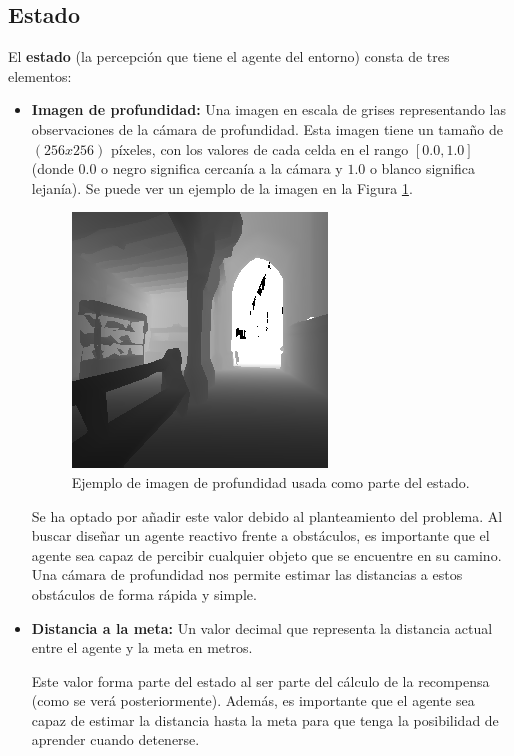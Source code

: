 \subsection{Estado}

El \textbf{estado} (la percepción que tiene el agente del entorno) consta de tres elementos:

\begin{itemize}
	\item \textbf{Imagen de profundidad:} Una imagen en escala de grises representando las observaciones de la cámara de profundidad. Esta imagen tiene un tamaño de $(256 x 256)$ píxeles, con los valores de cada celda en el rango $[0.0, 1.0]$ (donde $0.0$ o negro significa cercanía a la cámara y $1.0$ o blanco significa lejanía). Se puede ver un ejemplo de la imagen en la Figura \ref{fig:chap5-estado}.
	
\begin{figure}[h]
    \centering
    \includegraphics{imagenes/cap5/normalized.png}
    \caption{Ejemplo de imagen de profundidad usada como parte del estado.}
    \label{fig:chap5-estado}
\end{figure}			
			
	Se ha optado por añadir este valor debido al planteamiento del problema. Al buscar diseñar un agente reactivo frente a obstáculos, es importante que el agente sea capaz de percibir cualquier objeto que se encuentre en su camino. Una cámara de profundidad nos permite estimar las distancias a estos obstáculos de forma rápida y simple.	
	

	\item \textbf{Distancia a la meta:} Un valor decimal que representa la distancia actual entre el agente y la meta en metros.
	
	Este valor forma parte del estado al ser parte del cálculo de la recompensa (como se verá posteriormente). Además, es importante que el agente sea capaz de estimar la distancia hasta la meta para que tenga la posibilidad de aprender cuando detenerse.
	

\end{itemize}
